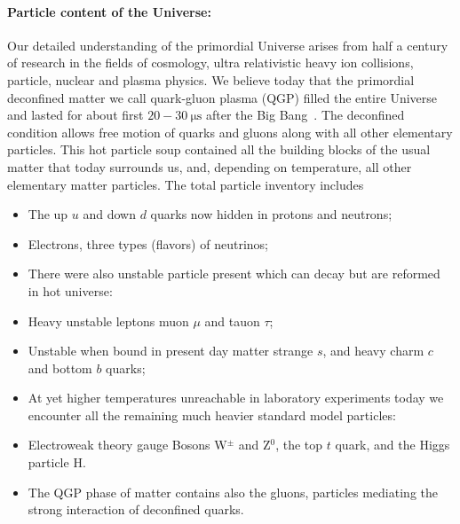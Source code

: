 \paragraph{Particle content of the Universe:} 
Our detailed understanding of the primordial Universe arises from half a century of research in the fields of cosmology, ultra relativistic heavy ion collisions, particle, nuclear and plasma physics. We believe today that the primordial deconfined matter we call quark-gluon plasma (QGP) filled the entire Universe and lasted for about first $20-30\ \mathrm{\mu s}$ after the Big Bang~\cite{Letessier:2002ony}. The deconfined condition allows free motion of quarks and gluons along with all other elementary particles. This hot particle soup contained all the building blocks of the usual matter that today surrounds us, and, depending on temperature, all other elementary matter particles. The total particle inventory includes
\begin{itemize}
\item The up $u$ and down $d$ quarks now hidden in protons and neutrons;
\item Electrons, three types (flavors) of neutrinos;
\item[] There were also unstable particle present which can decay but are reformed in hot universe:
\item Heavy unstable leptons muon $\mu$ and tauon $\tau$;
\item Unstable when bound in present day matter strange $s$, and heavy charm $c$ and bottom $b$ quarks;
\item[] At yet higher temperatures unreachable in laboratory  experiments today we encounter all the remaining much heavier standard model particles: 
\item Electroweak theory gauge Bosons W$^\pm$ and Z$^0$, the top $t$ quark, and the Higgs particle H.
\item The QGP phase of matter contains also the gluons, particles mediating the strong interaction of deconfined quarks.
\end{itemize}

